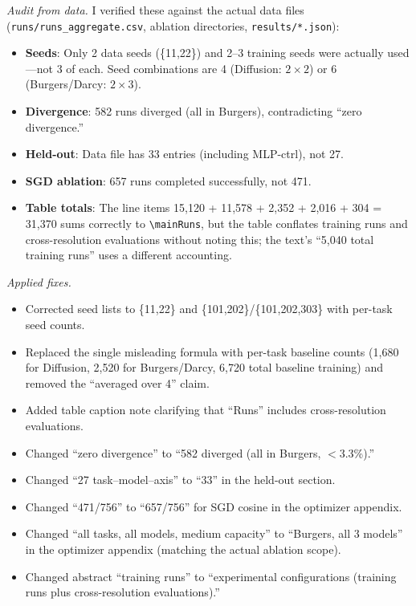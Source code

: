 \documentclass[11pt]{article}
\begin{document}
\begin{enumerate}
\emph{Audit from data.}
I verified these against the actual data files (\texttt{runs/runs\_aggregate.csv}, ablation directories, \texttt{results/*.json}):
\begin{itemize}
  \item \textbf{Seeds}: Only 2 data seeds (\{11,22\}) and 2--3 training seeds were actually used---not 3 of each. Seed combinations are 4 (Diffusion: $2\times2$) or 6 (Burgers/Darcy: $2\times3$).
  \item \textbf{Divergence}: 582 runs diverged (all in Burgers), contradicting ``zero divergence.''
  \item \textbf{Held-out}: Data file has 33 entries (including MLP-ctrl), not 27.
  \item \textbf{SGD ablation}: 657 runs completed successfully, not 471.
  \item \textbf{Table totals}: The line items 15{,}120 + 11{,}578 + 2{,}352 + 2{,}016 + 304 = 31{,}370 sums correctly to \texttt{\textbackslash mainRuns}, but the table conflates training runs and cross-resolution evaluations without noting this; the text's ``5{,}040 total training runs'' uses a different accounting.
\end{itemize}

\emph{Applied fixes.}
\begin{itemize}
  \item Corrected seed lists to \{11,22\} and \{101,202\}/\{101,202,303\} with per-task seed counts.
  \item Replaced the single misleading formula with per-task baseline counts (1{,}680 for Diffusion, 2{,}520 for Burgers/Darcy, 6{,}720 total baseline training) and removed the ``averaged over 4'' claim.
  \item Added table caption note clarifying that ``Runs'' includes cross-resolution evaluations.
  \item Changed ``zero divergence'' to ``582 diverged (all in Burgers, $<$3.3\%).''
  \item Changed ``27 task--model--axis'' to ``33'' in the held-out section.
  \item Changed ``471/756'' to ``657/756'' for SGD cosine in the optimizer appendix.
  \item Changed ``all tasks, all models, medium capacity'' to ``Burgers, all 3 models'' in the optimizer appendix (matching the actual ablation scope).
  \item Changed abstract ``training runs'' to ``experimental configurations (training runs plus cross-resolution evaluations).''
\end{itemize}


\end{enumerate}
\end{document}
